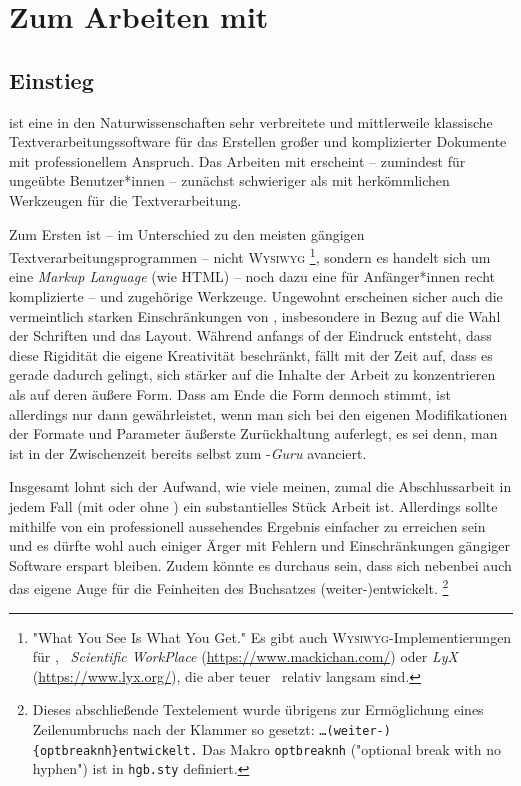 \chapter{Zum Arbeiten mit \latex}
\label{cha:ArbeitenMitLatex}

\section{Einstieg}
\label{sec:LatexEinstieg}

\latex ist eine in den Naturwissenschaften sehr verbreitete
und mittlerweile klassische Textverarbeitungssoftware für das Erstellen
großer und komplizierter Dokumente mit professionellem Anspruch.
Das Arbeiten mit \latex erscheint -- zumindest für ungeübte Benutzer*innen -- %
zunächst schwieriger als mit herkömmlichen Werkzeugen für die
Textverarbeitung.

Zum Ersten ist -- im Unterschied zu den meisten gängigen
Text\-ver\-arbei\-tungs\-prog\-ram\-men -- \latex nicht \textsc{Wysiwyg}%
\footnote{"What You See Is What You Get." Es gibt auch 
\textsc{Wysiwyg}-Implementierungen für \latex, 
\zB\ \emph{Scientific WorkPlace} (\url{https://www.mackichan.com/}) oder
\emph{LyX} (\url{https://www.lyx.org/}), 
die aber teuer \bzw\ relativ langsam sind.},
sondern es handelt sich um eine \emph{Markup Lang\-uage} (wie HTML) -- noch dazu
eine für Anfänger*innen recht komplizierte -- und zugehörige Werkzeuge.
Ungewohnt erscheinen sicher auch die vermeintlich starken
Einschränkungen von \latex,
insbesondere in Bezug auf die Wahl der Schriften und das
Layout. Während anfangs of der Eindruck entsteht, dass diese Rigidität
die eigene Kreativität beschränkt, fällt mit der Zeit auf, dass es gerade
dadurch gelingt, sich stärker auf die Inhalte der Arbeit zu
konzentrieren als auf deren äußere Form. Dass am Ende die Form dennoch stimmt,
ist allerdings nur dann gewährleistet, wenn man sich bei den eigenen Modifikationen
der Formate und Parameter äußerste Zurückhaltung auferlegt, es sei denn,
man ist in der Zwischenzeit bereits selbst zum \latex-\emph{Guru} avanciert.

Insgesamt lohnt sich der Aufwand, wie viele meinen, zumal die Abschlussarbeit
in jedem Fall (mit oder ohne \latex) ein substantielles Stück Arbeit ist.
Allerdings sollte mithilfe von \latex ein professionell aussehendes
Ergebnis einfacher zu erreichen sein und es dürfte wohl auch einiger
Ärger mit Fehlern und Einschränkungen gängiger Software erspart bleiben.
Zudem könnte es durchaus sein, dass sich nebenbei auch das eigene Auge für
die Feinheiten des Buchsatzes (weiter-){\obnh}entwickelt.%
\footnote{Dieses abschließende Textelement wurde übrigens zur Ermöglichung eines 
Zeilenumbruchs nach der Klammer so gesetzt: \texttt{\ldots (weiter-)\{{\bs}optbreaknh\}entwickelt.}
Das Makro \texttt{{\bs}optbreaknh} ("optional break with no hyphen") ist in 
\texttt{hgb.sty} definiert.}


